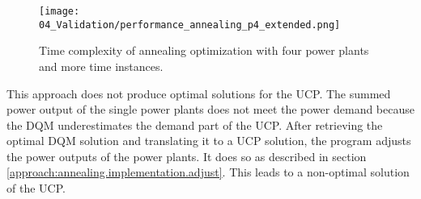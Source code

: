 \begin{figure}[h!]
  \centering
  \texttt{[image: 04\_Validation/performance\_annealing\_p4\_extended.png]}
  \caption{Time complexity of annealing optimization with four power plants and more time instances.}
  \label{figure:validation.annealin.performance.extended}
\end{figure}

This approach does not produce optimal solutions for the UCP.
The summed power output of the single power plants does not meet the power demand because the DQM underestimates the demand part of the UCP.
After retrieving the optimal DQM solution and translating it to a UCP solution, the program adjusts the power outputs of the power plants.
It does so as described in section \ref{approach:annealing.implementation.adjust}.
This leads to a non-optimal solution of the UCP.
